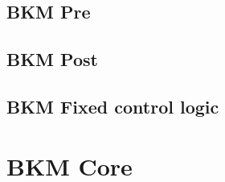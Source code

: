 \documentclass[10pt,a4paper]{book}
\begin{document}
      \subsection{BKM Pre}
      \subsection{BKM Post}
      \subsection{BKM Fixed control logic}


   \section{BKM Core}
\end{document}

